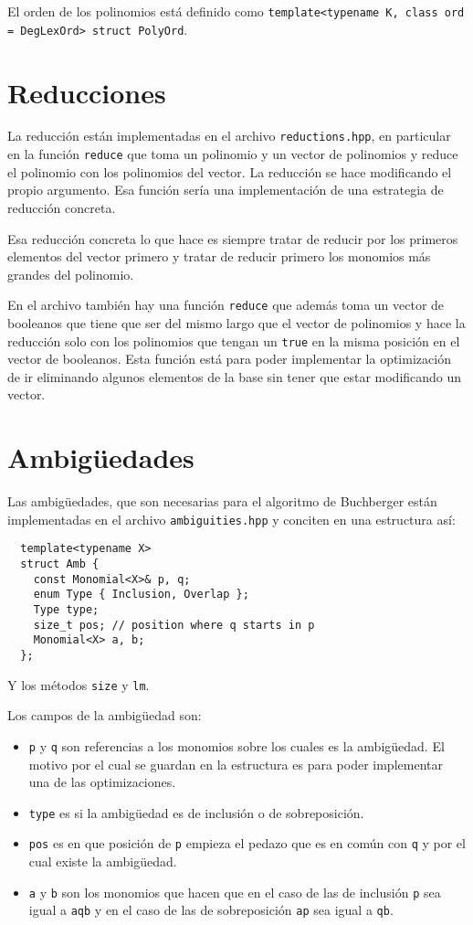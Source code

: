 \documentclass[12pt]{report}
\theoremstyle{customstyle}
\theoremstyle{factstyle}
\begin{document}
El orden de los polinomios está definido como \texttt{template<typename K, class ord = DegLexOrd> struct PolyOrd}.

\section{Reducciones}

La reducción están implementadas en el archivo \texttt{reductions.hpp}, en particular en la función \texttt{reduce} que toma un polinomio y un vector de polinomios y reduce el polinomio con los polinomios del vector. La reducción se hace modificando el propio argumento. Esa función sería una implementación de una estrategia de reducción concreta.

Esa reducción concreta lo que hace es siempre tratar de reducir por los primeros elementos del vector primero y tratar de reducir primero los monomios más grandes del polinomio.

En el archivo también hay una función \texttt{reduce} que además toma un vector de booleanos que tiene que ser del mismo largo que el vector de polinomios y hace la reducción solo con los polinomios que tengan un \texttt{true} en la misma posición en el vector de booleanos. Esta función está para poder implementar la optimización de ir eliminando algunos elementos de la base sin tener que estar modificando un vector.

\section{Ambigüedades}

Las ambigüedades, que son necesarias para el algoritmo de Buchberger están implementadas en el archivo \texttt{ambiguities.hpp} y conciten en una estructura así:

\begin{verbatim}
  template<typename X>
  struct Amb {
    const Monomial<X>& p, q;
    enum Type { Inclusion, Overlap };
    Type type;
    size_t pos; // position where q starts in p
    Monomial<X> a, b;
  };
\end{verbatim}

Y los métodos \texttt{size} y \texttt{lm}.

Los campos de la ambigüedad son:

\begin{itemize}
  \item \texttt{p} y \texttt{q} son referencias a los monomios sobre los cuales es la ambigüedad. El motivo por el cual se guardan en la estructura es para poder implementar una de las optimizaciones.
  \item \texttt{type} es si la ambigüedad es de inclusión o de sobreposición.
  \item \texttt{pos} es en que posición de \texttt{p} empieza el pedazo que es en común con \texttt{q} y por el cual existe la ambigüedad.
  \item \texttt{a} y \texttt{b} son los monomios que hacen que en el caso de las de inclusión \texttt{p} sea igual a \texttt{aqb} y en el caso de las de sobreposición \texttt{ap} sea igual a \texttt{qb}.
\end{itemize}
\end{document}
